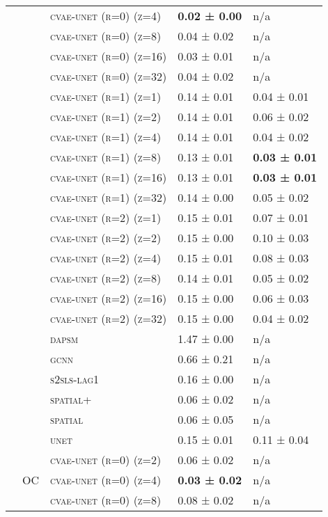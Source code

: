 \documentclass{article}
\begin{document}
\begin{table}[!tbp]
\begin{tabular}{lllll}
 &  & \textsc{cvae-unet (r=0) (z=4)} & \bf 0.02 ± { 0.00} & n/a \\
 &  & \textsc{cvae-unet (r=0) (z=8)} & 0.04 ± { 0.02} & n/a \\
 &  & \textsc{cvae-unet (r=0) (z=16)} & 0.03 ± { 0.01} & n/a \\
 &  & \textsc{cvae-unet (r=0) (z=32)} & 0.04 ± { 0.02} & n/a \\
 &  & \textsc{cvae-unet (r=1) (z=1)} & 0.14 ± { 0.01} & 0.04 ± { 0.01} \\
 &  & \textsc{cvae-unet (r=1) (z=2)} & 0.14 ± { 0.01} & 0.06 ± { 0.02} \\
 &  & \textsc{cvae-unet (r=1) (z=4)} & 0.14 ± { 0.01} & 0.04 ± { 0.02} \\
 &  & \textsc{cvae-unet (r=1) (z=8)} & 0.13 ± { 0.01} & \bf 0.03 ± { 0.01} \\
 &  & \textsc{cvae-unet (r=1) (z=16)} & 0.13 ± { 0.01} & \bf 0.03 ± { 0.01} \\
 &  & \textsc{cvae-unet (r=1) (z=32)} & 0.14 ± { 0.00} & 0.05 ± { 0.02} \\
 &  & \textsc{cvae-unet (r=2) (z=1)} & 0.15 ± { 0.01} & 0.07 ± { 0.01} \\
 &  & \textsc{cvae-unet (r=2) (z=2)} & 0.15 ± { 0.00} & 0.10 ± { 0.03} \\
 &  & \textsc{cvae-unet (r=2) (z=4)} & 0.15 ± { 0.01} & 0.08 ± { 0.03} \\
 &  & \textsc{cvae-unet (r=2) (z=8)} & 0.14 ± { 0.01} & 0.05 ± { 0.02} \\
 &  & \textsc{cvae-unet (r=2) (z=16)} & 0.15 ± { 0.00} & 0.06 ± { 0.03} \\
 &  & \textsc{cvae-unet (r=2) (z=32)} & 0.15 ± { 0.00} & 0.04 ± { 0.02} \\
 &  & \textsc{dapsm} & 1.47 ± { 0.00} & n/a \\
 &  & \textsc{gcnn} & 0.66 ± { 0.21} & n/a \\
 &  & \textsc{s2sls-lag1} & 0.16 ± { 0.00} & n/a \\
 &  & \textsc{spatial+} & 0.06 ± { 0.02} & n/a \\
 &  & \textsc{spatial} & 0.06 ± { 0.05} & n/a \\
 &  & \textsc{unet} & 0.15 ± { 0.01} & 0.11 ± { 0.04} \\
\cline{2-5}
 & \multirow[t]{23}{*}{OC} & \textsc{cvae-unet (r=0) (z=2)} & 0.06 ± { 0.02} & n/a \\
 &  & \textsc{cvae-unet (r=0) (z=4)} & \bf 0.03 ± { 0.02} & n/a \\
 &  & \textsc{cvae-unet (r=0) (z=8)} & 0.08 ± { 0.02} & n/a \\

\end{tabular}
\end{table}
\end{document}
